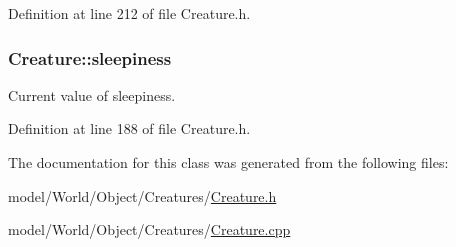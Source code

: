 Definition at line 212 of file Creature.\-h.

\hypertarget{classCreature_a3f6c69d85deb3a91a823913e67f19709}{
\subsubsection[{sleepiness}]{ Creature\-::sleepiness\hspace{0.3cm}{\ttfamily [protected]}}}\label{classCreature_a3f6c69d85deb3a91a823913e67f19709}


Current value of sleepiness. 



Definition at line 188 of file Creature.\-h.



The documentation for this class was generated from the following files\-:\begin{DoxyCompactItemize}
\item 
model/\-World/\-Object/\-Creatures/\hyperlink{Creature_8h}{Creature.\-h}\item 
model/\-World/\-Object/\-Creatures/\hyperlink{Creature_8cpp}{Creature.\-cpp}\end{DoxyCompactItemize}
